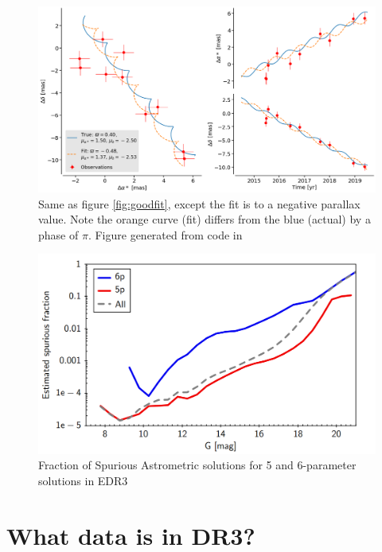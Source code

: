 \documentclass[twocolumn]{aastex631}
\begin{document}
\begin{figure}
	\includegraphics[width=\columnwidth]{astrometric-bad.png}
	\caption{Same as figure \ref{fig:goodfit}, except the fit is to a negative parallax value. Note the orange curve (fit) differs from the blue (actual) by a phase of $\pi$. Figure generated from code in \cite{luriGaia2018}}
	\label{fig:badfit}
\end{figure}

\begin{figure}
	\includegraphics[width=\columnwidth]{spuriousfraction.png}
	\caption{Fraction of Spurious Astrometric solutions for 5 and 6-parameter solutions in EDR3\citep{fabriciusGaia2021}}
	\label{fig:spuriousfraction}
\end{figure}




\section{What data is in DR3?} \label{sec:data}
\end{document}
